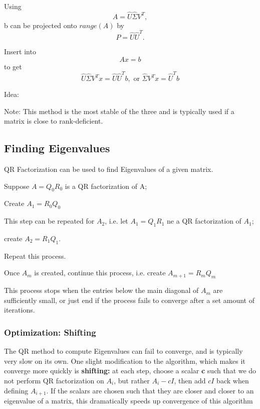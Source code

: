 \documentclass{article}
\begin{document}
Using $$A=\hat{U}\hat{\Sigma}V^{T},$$ b can be projected onto $range(A)$ by $$P=\hat{U}\hat{U}^{T}.$$

Insert into $$Ax=b$$ to get $$\hat{U}\hat{\Sigma}V^{T}x = \hat{U}\hat{U}^{T}b, \text{ or } \hat{\Sigma}V^{T}x = \hat{U}^{T}b$$

Idea:
\begin{enumerate}

    \item Compute the reduced SVD $A=\hat{U}\hat{\Sigma}V^{T}$
    \item Compute the vector $\hat{U}^{T}b$
    \item Solve the diagonal system $\hat{\Sigma}\omega = \hat{U}^{Tb, $ for $\omega$
    \item Set $x = V\omega$
\end{enumerate}

Note: This method is the most stable of the three and is typically used if a matrix is close to rank-deficient.


\subsection{Finding Eigenvalues}
QR Factorization can be used to find Eigenvalues of a given matrix.

Suppose $A=Q_{0}R_{0}$ is a QR factorization of A;

Create $A_{1}=R_{0}Q_{0}$

This step can be repeated for $A_2$, i.e. let $A_{1}=Q_{1}R_{1}$ ne a QR factorization of $A_{1}$; 

create $A_{2}=R_{1}Q_{1}$.

Repeat this process. 

Once $A_{m}$ is created, continue this process, i.e. create $A_{m+1}=R_{m}Q_{m}$

This process stops when the entries below the main diagonal of $A_{m}$ are sufficiently small, or just end if the process fails to converge after a set amount of iterations.

\subsubsection{Optimization: Shifting}
The QR method to compute Eigenvalues can fail to converge, and is typically very slow on its own. One slight modification to the algorithm, which makes it converge more quickly is \textbf{shifting:} at each step, choose a scalar \textbf{c} such that we do not perform QR factorization on $A_{i}$, but rather $A_{i}-cI$, then add $cI$ back when defining $A_{i+1}$. If the scalars are chosen such that they are closer and closer to an eigenvalue of a matrix, this dramatically speeds up convergence of this algorithm
\end{document}
